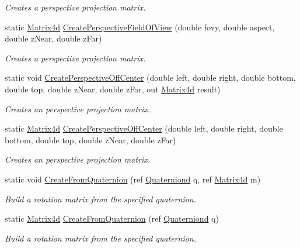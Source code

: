 \begin{DoxyCompactItemize}
\begin{DoxyCompactList}\small\item\em Creates a perspective projection matrix. \end{DoxyCompactList}\item 
static \hyperlink{struct_open_t_k_1_1_matrix4d}{Matrix4d} \hyperlink{struct_open_t_k_1_1_matrix4d_a2fc6f43af8a7aa2859f13f78b62acc40}{Create\-Perspective\-Field\-Of\-View} (double fovy, double aspect, double z\-Near, double z\-Far)
\begin{DoxyCompactList}\small\item\em Creates a perspective projection matrix. \end{DoxyCompactList}\item 
static void \hyperlink{struct_open_t_k_1_1_matrix4d_a90825de4545c5cab437f12e348b9c336}{Create\-Perspective\-Off\-Center} (double left, double right, double bottom, double top, double z\-Near, double z\-Far, out \hyperlink{struct_open_t_k_1_1_matrix4d}{Matrix4d} result)
\begin{DoxyCompactList}\small\item\em Creates an perspective projection matrix. \end{DoxyCompactList}\item 
static \hyperlink{struct_open_t_k_1_1_matrix4d}{Matrix4d} \hyperlink{struct_open_t_k_1_1_matrix4d_a704adb22f1872e883d8dd47031049b2c}{Create\-Perspective\-Off\-Center} (double left, double right, double bottom, double top, double z\-Near, double z\-Far)
\begin{DoxyCompactList}\small\item\em Creates an perspective projection matrix. \end{DoxyCompactList}\item 
static void \hyperlink{struct_open_t_k_1_1_matrix4d_a7ff9ab2107d5c398adec5a9a1001281e}{Create\-From\-Quaternion} (ref \hyperlink{struct_open_t_k_1_1_quaterniond}{Quaterniond} q, ref \hyperlink{struct_open_t_k_1_1_matrix4d}{Matrix4d} m)
\begin{DoxyCompactList}\small\item\em Build a rotation matrix from the specified quaternion. \end{DoxyCompactList}\item 
static \hyperlink{struct_open_t_k_1_1_matrix4d}{Matrix4d} \hyperlink{struct_open_t_k_1_1_matrix4d_a5015460a8363a077d0dcaf24b0825eec}{Create\-From\-Quaternion} (ref \hyperlink{struct_open_t_k_1_1_quaterniond}{Quaterniond} q)
\begin{DoxyCompactList}\small\item\em Build a rotation matrix from the specified quaternion. \end{DoxyCompactList}\item 

\end{DoxyCompactItemize}
